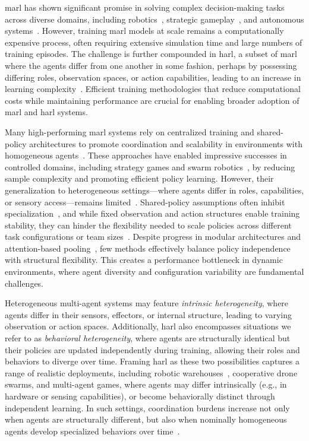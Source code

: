 \documentclass{article}
\begin{document}
\Gls{marl} has shown significant promise in solving complex 
decision-making tasks across diverse domains, including 
robotics~\cite{rizk2019, liang2024}, 
strategic gameplay~\cite{silver2016, vinyals2019, berner2019}, 
and autonomous systems~\cite{abeywickrama2022}. 
However, training \gls{marl} models at scale remains a computationally expensive process, 
often requiring extensive simulation time and large numbers of training episodes. 
The challenge is further compounded in \gls{harl}, 
a subset of \gls{marl} where the agents 
differ from one another in some fashion, perhaps by possessing 
differing roles, observation spaces, 
or action capabilities, leading to an increase in learning complexity~\cite{rizk2019, yang2021a}.
Efficient training methodologies that reduce computational costs while maintaining 
performance are crucial for enabling broader adoption of \gls{marl} and \gls{harl} systems.

Many high-performing \gls{marl} systems rely on 
centralized training and shared-policy architectures to promote coordination and scalability 
in environments with homogeneous agents~\cite{ackermann2019,zhou2023}.
These approaches have enabled impressive successes in controlled domains, 
including strategy games and swarm robotics~\cite{vinyals2019, hoang2023}, 
by reducing sample complexity and promoting efficient policy learning. However, their 
generalization to heterogeneous settings—where agents differ in roles, capabilities, or 
sensory access—remains limited~\cite{zhong2024}. 
Shared-policy assumptions often inhibit specialization~\cite{smit2023}, 
and while fixed observation and action structures enable training stability, 
they can hinder the flexibility needed to scale policies across different 
task configurations or team sizes~\cite{papoudakis2021}. Despite progress 
in modular architectures and attention-based pooling~\cite{iqbal2021, foerster2018}, 
few methods effectively balance policy independence with structural flexibility. 
This creates a performance bottleneck in dynamic environments, where agent diversity and 
configuration variability are fundamental challenges.

Heterogeneous multi-agent systems may feature \emph{intrinsic heterogeneity}, 
where agents differ in their sensors, effectors, or internal structure, 
leading to varying observation or action spaces. Additionally, 
\gls{harl} also encompasses situations we refer to as \emph{behavioral heterogeneity}, 
where agents are structurally identical but their policies are updated independently 
during training, allowing their roles and behaviors to diverge over time. 
Framing \gls{harl} as these two possibilities captures a range of realistic deployments, including 
robotic warehouses~\cite{rizk2019}, cooperative drone swarms, and multi-agent games, where 
agents may differ intrinsically (e.g., in hardware or sensing capabilities), 
or become behaviorally distinct through independent learning. In such settings, 
coordination burdens increase not only when agents are structurally different, 
but also when nominally homogeneous agents develop specialized behaviors over 
time~\cite{shoham2007,ackermann2019}.
\end{document}
